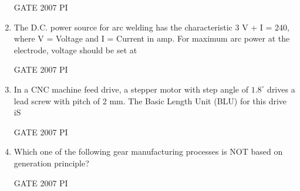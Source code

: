 \documentclass[journal,12pt,onecolumn]{IEEEtran}
\theoremstyle{remark}
\begin{document}
\begin{enumerate}
 \hfill{GATE 2007 PI}
\begin{enumerate}
\end{enumerate}
\item 
The D.C. power source for arc welding has the characteristic 3 V + I = 240, where V = Voltage and I = Current in amp. For maximum arc power at the electrode, voltage should be set at

\hfill{GATE 2007 PI}
\begin{enumerate}
    
\end{enumerate}

\item	
In a CNC machine feed drive, a stepper motor with step angle of  $1.8^\circ$
 drives a lead screw with pitch of 2 mm. The Basic Length Unit (BLU) for this drive iS
 
 \hfill{GATE 2007 PI}
 \begin{enumerate}
 \end{enumerate}
 
\item
 Which one of the following gear manufacturing processes is NOT based on generation principle?

 \hfill{GATE 2007 PI}
 \begin{enumerate}
 \end{enumerate} 


\end{enumerate}
\end{document}
